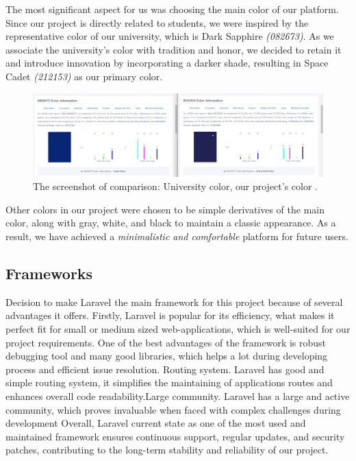 The most significant aspect for us was choosing the main color of our platform. Since our project is directly related to students, we were inspired by the representative color of our university, which is Dark Sapphire \textit{(082673)}. As we associate the university's color with tradition and honor, we decided to retain it and introduce innovation by incorporating a darker shade, resulting in Space Cadet \textit{(212153)} as our primary color. 

\begin{figure}[ht]\label{fig:colors}
  \centering
  \includegraphics[width=0.8\linewidth]{figures/color comparison.jpg}
  \caption{The screenshot of comparison: University color, our project's color .}
\end{figure}
\newpage
Other colors in our project were chosen to be simple derivatives of the main color, along with gray, white, and black to maintain a classic appearance. As a result, we have achieved a \textit{minimalistic and comfortable} platform for future users.

\subsection{Frameworks}\label{frmw}
Decision to make Laravel \cite{laravel} the main framework for this project because of several advantages it offers. Firstly, Laravel \cite{laravel} is popular for its efficiency, what makes it perfect fit for small or medium sized web-applications, which is well-suited for our project requirements. One of the best advantages of the framework is robust debugging tool and many good libraries, which helps a lot during developing process and efficient issue resolution.
Routing system. Laravel \cite{laravel} has good and simple routing system, it simplifies the maintaining of applications routes and enhances overall code readability.Large community. Laravel \cite{laravel} has a large and active community, which proves invaluable when faced with complex challenges during development
Overall, Laravel \cite{laravel} current state as one of the most used and maintained framework ensures continuous support, regular updates, and security patches, contributing to the long-term stability and reliability of our project.
\par

